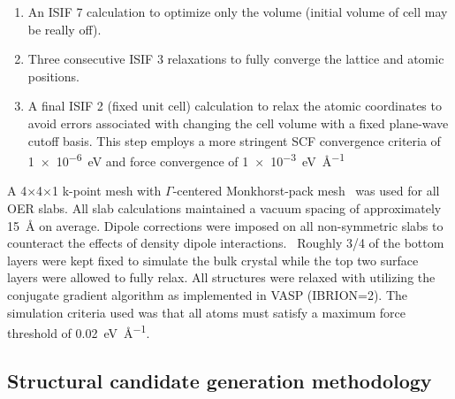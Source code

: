 \begin{enumerate}
  \item An ISIF \num{7} calculation to optimize only the volume (initial volume of cell may be really off).
  \item Three consecutive ISIF \num{3} relaxations to fully converge the lattice and atomic positions.
  \item A final ISIF \num{2} (fixed unit cell) calculation to relax the atomic coordinates to avoid errors associated with changing the cell volume with a fixed plane-wave cutoff basis.
  This step employs a more stringent SCF convergence criteria of \SI{1e-6}{\electronvolt} and force convergence of \SI{1e-3}{\electronvolt\per\angstrom}
\end{enumerate}
%
%
A 4$\times$4$\times$1 k-point mesh with $\Gamma$-centered Monkhorst-pack mesh~\cite{Monkhorst1976} was used for all OER slabs.
%
%
All slab calculations maintained a vacuum spacing of approximately \SI{15}{\angstrom} on average.
%
Dipole corrections were imposed on all non-symmetric slabs to counteract the effects of density dipole interactions.~\cite{Neugebauer1992}
%
Roughly \num{3/4} of the bottom layers were kept fixed to simulate the bulk crystal while the top two surface layers were allowed to fully relax.
%
All structures were relaxed with utilizing the conjugate gradient algorithm as implemented in VASP (IBRION\num{=2}).
%
The simulation criteria used was that all atoms must satisfy a maximum force threshold of \SI{0.02}{\electronvolt\per\angstrom}.



\subsection{Structural candidate generation methodology}
%

